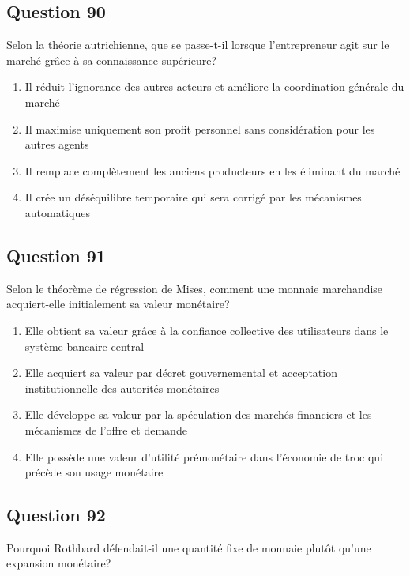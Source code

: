 \documentclass[12pt,a4paper]{article}
\begin{document}
\bigskip


\subsection*{Question 90}
Selon la théorie autrichienne, que se passe-t-il lorsque l'entrepreneur agit sur le marché grâce à sa connaissance supérieure?

\begin{enumerate}[label=\Alph*., leftmargin=*]
\item Il réduit l'ignorance des autres acteurs et améliore la coordination générale du marché
\item Il maximise uniquement son profit personnel sans considération pour les autres agents
\item Il remplace complètement les anciens producteurs en les éliminant du marché
\item Il crée un déséquilibre temporaire qui sera corrigé par les mécanismes automatiques
\end{enumerate}

\bigskip


\subsection*{Question 91}
Selon le théorème de régression de Mises, comment une monnaie marchandise acquiert-elle initialement sa valeur monétaire?

\begin{enumerate}[label=\Alph*., leftmargin=*]
\item Elle obtient sa valeur grâce à la confiance collective des utilisateurs dans le système bancaire central
\item Elle acquiert sa valeur par décret gouvernemental et acceptation institutionnelle des autorités monétaires
\item Elle développe sa valeur par la spéculation des marchés financiers et les mécanismes de l'offre et demande
\item Elle possède une valeur d'utilité prémonétaire dans l'économie de troc qui précède son usage monétaire
\end{enumerate}

\bigskip


\subsection*{Question 92}
Pourquoi Rothbard défendait-il une quantité fixe de monnaie plutôt qu'une expansion monétaire?
\end{document}
